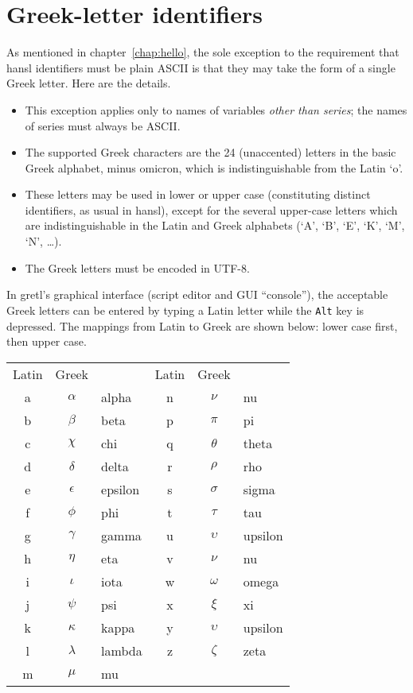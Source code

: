 \chapter{Greek-letter identifiers}
\label{chap:greeks}

As mentioned in chapter~\ref{chap:hello}, the sole exception to the
requirement that hansl identifiers must be plain ASCII is that they
may take the form of a single Greek letter. Here are the details.

\begin{itemize}
\item This exception applies only to names of variables \textit{other
    than series}; the names of series must always be ASCII.
\item The supported Greek characters are the 24 (unaccented) letters
  in the basic Greek alphabet, minus omicron, which is
  indistinguishable from the Latin `o'.
\item These letters may be used in lower or upper case (constituting
  distinct identifiers, as usual in hansl), except for the several
  upper-case letters which are indistinguishable in the Latin and
  Greek alphabets (`A', `B', `E', `K', `M', `N', \dots).
\item The Greek letters must be encoded in UTF-8.
\end{itemize}

In gretl's graphical interface (script editor and GUI ``console''),
the acceptable Greek letters can be entered by typing a Latin letter
while the \texttt{Alt} key is depressed. The mappings from Latin to
Greek are shown below: lower case first, then upper case.

\begin{center}
  \begin{tabular}{ccl@{\hskip 4em}ccl}
    Latin & Greek & & Latin & Greek \\[4pt]
    a & $\alpha$ & alpha & n & $\nu$ & nu \\
    b & $\beta$ & beta & p & $\pi$ & pi \\
    c & $\chi$ & chi & q & $\theta$ & theta \\
    d & $\delta$ & delta & r & $\rho$ & rho \\
    e & $\epsilon$ & epsilon & s & $\sigma$ & sigma \\
    f & $\phi$ & phi & t & $\tau$ & tau \\
    g & $\gamma$ & gamma & u & $\upsilon$ & upsilon \\
    h & $\eta$ & eta & v & $\nu$ & nu \\
    i & $\iota$ & iota & w & $\omega$ & omega \\
    j & $\psi$ & psi & x & $\xi$ & xi \\
    k & $\kappa$ & kappa & y & $\upsilon$ & upsilon \\
    l & $\lambda$ & lambda & z & $\zeta$ & zeta \\
    m & $\mu$ & mu \\
  \end{tabular}
\end{center}


